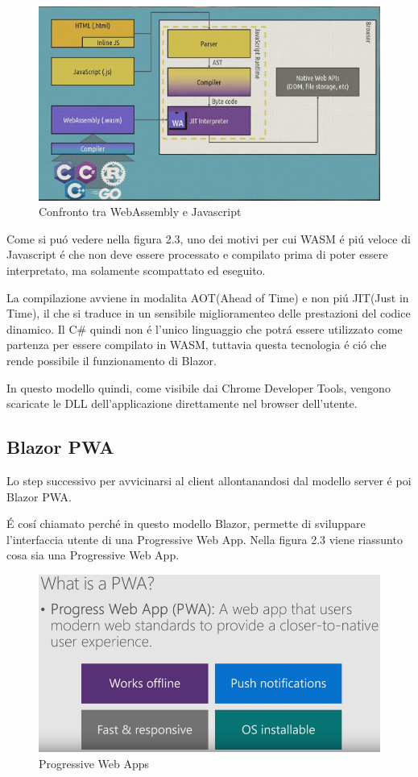 \begin{figure}[H]
	\centerline{\includegraphics[scale=0.7]{figure/WasmVSJavascript.PNG}}
	\caption{Confronto tra WebAssembly e Javascript}
	\label{fig:WasmVSJavascript}
\end{figure}
Come si pu\'o vedere nella figura 2.3, uno dei motivi per cui WASM \'e pi\'u veloce di Javascript \'e che non deve essere processato e compilato prima di poter essere interpretato, ma solamente scompattato ed eseguito.

La compilazione avviene in modalita AOT(Ahead of Time) e non pi\'u JIT(Just in Time), il che si traduce in un sensibile miglioramenteo delle prestazioni del codice dinamico.
Il C\# quindi non \'e l'unico linguaggio che potr\'a essere utilizzato come partenza per essere compilato in WASM, tuttavia questa tecnologia \'e ci\'o che rende possibile il funzionamento di Blazor.

In questo modello quindi, come visibile dai Chrome Developer Tools, vengono scaricate le DLL dell'applicazione direttamente nel browser dell'utente.

\subsection{Blazor PWA}\label{sez:bpwa}
Lo step successivo per avvicinarsi al client allontanandosi dal modello server \'e poi Blazor PWA.

\'E cos\'i chiamato perch\'e in questo modello Blazor, permette di sviluppare l'interfaccia utente di una Progressive Web App.
Nella figura 2.3 viene riassunto cosa sia una Progressive Web App.

\begin{figure}[H]
	\centerline{\includegraphics[scale=0.5]{figure/ProgressiveWebApp.png}}
	\caption{Progressive Web Apps}
	\label{fig:WhatIsAPWA}
\end{figure}

